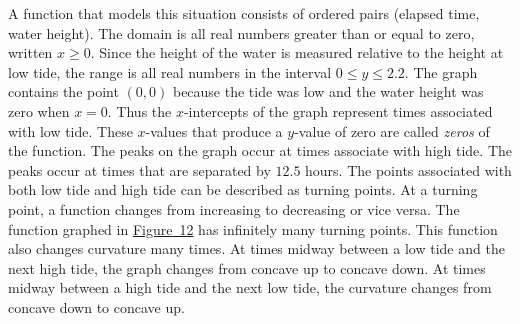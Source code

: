 \documentclass[10pt,]{book}
\theoremstyle{ptxdefinitionnotitle}
\theoremstyle{ptxdefinitiontitle}
\numberwithin{equation}{section}
\begin{document}
\begin{example}
A function that models this situation consists of ordered pairs (elapsed time, water height).  The domain is all real numbers greater than or equal to zero, written \(x \geq 0\).  Since the height of the water is measured relative to the height at low tide, the range is all real numbers in the interval \(0 \leq y \leq 2.2\). The graph contains the point \(\left( 0, 0 \right)\) because the tide was low and the water height was zero when \(x = 0\). Thus the \(x\)-intercepts of the graph represent times associated with low tide. These \(x\)-values that produce a \(y\)-value of zero are called \emph{zeros} of the function. The peaks on the graph occur at times associate with high tide. The peaks occur at times that are separated by \(12.5\) hours. The points associated with both low tide and high tide can be described as turning points.  At a turning point, a function changes from increasing to decreasing or vice versa.  The function graphed in \hyperref[chapter02-section01-example03-graph]{Figure~12} has infinitely many turning points.  This function also changes curvature many times.  At times midway between a low tide and the next high tide, the graph changes from concave up to concave down. At times midway between a high tide and the next low tide, the curvature changes from concave down to concave up.%
\end{example}
\typeout{************************************************}
\typeout{************************************************}
\end{document}
